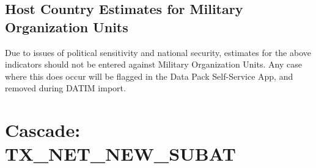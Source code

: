 \documentclass[
  openany]{book}
\begin{document}
\hypertarget{host-country-estimates-for-military-organization-units}{%
\subsection{Host Country Estimates for Military Organization Units}\label{host-country-estimates-for-military-organization-units}}

Due to issues of political sensitivity and national security, estimates
for the above indicators should not be entered against Military
Organization Units. Any case where this does occur will be flagged in
the Data Pack Self-Service App, and removed during DATIM import.

\hypertarget{cascade-tx_net_new_subat}{%
\section{Cascade: TX\_NET\_NEW\_SUBAT}\label{cascade-tx_net_new_subat}}

\begin{table}[H]
\centering\begingroup\fontsize{12}{14}\selectfont

\endgroup{}
\end{table}
\end{document}
